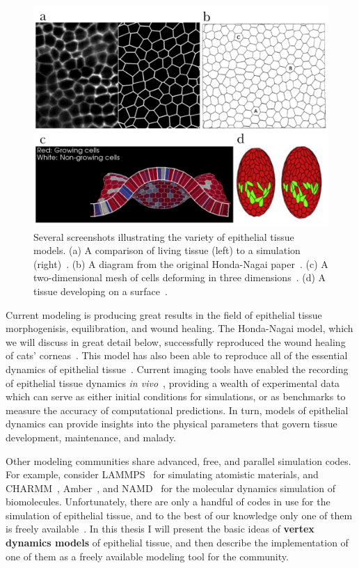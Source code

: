 \begin{figure}[h]
    \centering
    \includegraphics[width=\textwidth]{../diagrams/abcd3.pdf}
    \caption[Various Models of Epithelial Tissue]{Several screenshots illustrating the variety of epithelial tissue models. (a) A comparison of living tissue (left) to a simulation (right)~\cite{Yoshi}. (b) A diagram from the original Honda-Nagai paper~\cite{HondaNagai}. (c) A two-dimensional mesh of cells deforming in three dimensions~\cite{Okuda1}. (d) A tissue developing on a surface~\cite{VertexModels}.}
    \label{fig:fourgraphs}
\end{figure}

Current modeling is producing great results in the field of epithelial tissue morphogenisis, equilibration, and wound healing. The Honda-Nagai model, which we will discuss in great detail below, successfully reproduced the wound healing of cats' corneas~\cite{WoundHealing}. This model has also been able to reproduce all of the essential dynamics of epithelial tissue~\cite{HondaNagai}.  Current imaging tools have enabled the recording of epithelial tissue dynamics \emph{in vivo}~\cite{Sokolow, Xiong}, providing a wealth of experimental data which can serve as either initial conditions for simulations, or as benchmarks to measure the accuracy of computational predictions. In turn, models of epithelial dynamics can provide insights into the physical parameters that govern tissue development, maintenance, and malady.

Other modeling communities share advanced, free, and parallel simulation codes. For example, consider LAMMPS~\cite{LAMMPS} for simulating atomistic materials, and CHARMM~\cite{CHARMM}, Amber~\cite{Amber}, and NAMD~\cite{NAMD} for the molecular dynamics simulation of biomolecules. Unfortunately, there are only a handful of codes in use for the simulation of epithelial tissue, and to the best of our knowledge only one of them is freely available~\cite{ChasteMain}. In this thesis I will present the basic ideas of \textbf{vertex dynamics models} of epithelial tissue, and then describe the implementation of one of them as a freely available modeling tool for the community.

